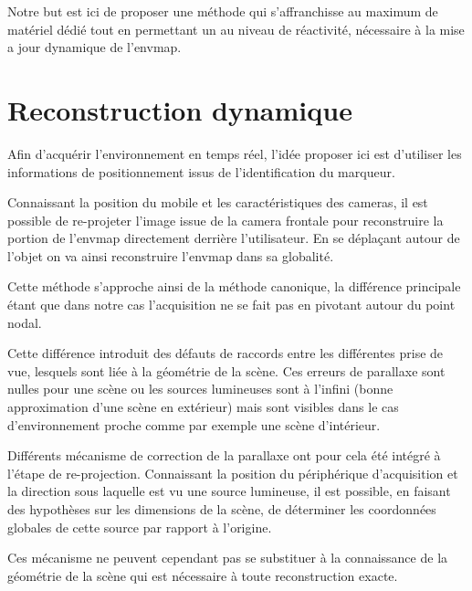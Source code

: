 \documentclass[10pt,a4paper,twoside, twocolumn]{report}
\newcommand*{\rootPath}{../}
\begin{document}
Notre but est ici de proposer une méthode qui s’affranchisse au maximum de matériel dédié tout en permettant un au niveau de réactivité, nécessaire à la mise a jour dynamique de l’envmap.


\section{Reconstruction dynamique}

Afin d’acquérir l’environnement en temps réel, l’idée proposer ici est d'utiliser les informations de positionnement issus de l’identification du marqueur.

Connaissant la position du mobile et les caractéristiques des cameras, il est possible de re-projeter l'image issue de la camera frontale pour reconstruire la portion de l'envmap directement derrière l'utilisateur. En se déplaçant autour de l'objet on va ainsi reconstruire l'envmap dans sa globalité.

Cette méthode s'approche ainsi de la méthode canonique, la différence principale étant que dans notre cas l'acquisition ne se fait pas en pivotant autour du point nodal.

Cette différence introduit des défauts de raccords entre les différentes prise de vue, lesquels sont liée à la géométrie de la scène. Ces erreurs de parallaxe sont nulles pour une scène ou les sources lumineuses sont à l'infini (bonne approximation d'une scène en extérieur) mais sont visibles dans le cas d'environnement proche comme par exemple une scène d'intérieur.

Différents mécanisme de correction de la parallaxe ont pour cela été intégré à l'étape de re-projection. Connaissant la position du périphérique d'acquisition et la direction sous laquelle est vu une source lumineuse, il est possible, en faisant des hypothèses sur les dimensions de la scène, de déterminer les coordonnées globales de cette source par rapport à l’origine.

Ces mécanisme ne peuvent cependant pas se substituer à la connaissance de la géométrie de la scène qui est nécessaire à toute reconstruction exacte.


\ifstandalone
	
	
\fi
\end{document}
